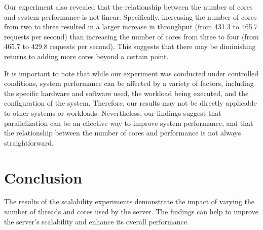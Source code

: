 \documentclass{article}
\begin{document}
Our experiment also revealed that the relationship between the number of cores and system performance is not linear. Specifically, increasing the number of cores from two to three resulted in a larger increase in throughput (from 431.3 to 465.7 requests per second) than increasing the number of cores from three to four (from 465.7 to 429.8 requests per second). This suggests that there may be diminishing returns to adding more cores beyond a certain point.

It is important to note that while our experiment was conducted under controlled conditions, system performance can be affected by a variety of factors, including the specific hardware and software used, the workload being executed, and the configuration of the system. Therefore, our results may not be directly applicable to other systems or workloads. Nevertheless, our findings suggest that parallelization can be an effective way to improve system performance, and that the relationship between the number of cores and performance is not always straightforward.
\section{Conclusion}
The results of the scalability experiments demonstrate the impact of varying the number of threads and cores used by the server. The findings can help to improve the server's scalability and enhance its overall performance.
\end{document}
